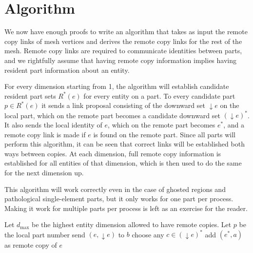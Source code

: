 \documentclass{article}
\begin{document}
\section{Algorithm}

We now have enough proofs to write an algorithm that takes
as input the remote copy links of mesh vertices and
derives the remote copy links for the rest of the mesh.
Remote copy links are required to communicate identities
between parts, and we rightfully assume that having
remote copy information implies having resident part information
about an entity.

For every dimension starting from 1, the algorithm will establish
candidate resident part sets $R^*(e)$ for every entity on a part.
To every candidate part $p \in R^*(e)$ it sends a link proposal
consisting of the downward set $\downarrow e$ on the local part,
which on the remote part becomes a candidate downward set
$(\downarrow e)^*$.
It also sends the local identity of $e$, which
on the remote part becomes $e^*$, and a
remote copy link is made if $e$ is found on
the remote part.
Since all parts will perform this algorithm, it can be seen
that correct links will be established both ways between
copies.
At each dimension, full remote copy information is established
for all entities of that dimension, which is then used to
do the same for the next dimension up.

This algorithm will work correctly even in the case of ghosted
regions and pathological single-element parts,
but it only works for one part per process.
Making it work for multiple parts per process is left as
an exercise for the reader.

\pagebreak

\begin{algorithmic}
\State Let $d_\text{max}$ be the highest entity dimension allowed
to have remote copies.
\State Let $p$ be the local part number
\State send $(e,\downarrow e)$ to $b$
\EndFor
\EndFor
{}
\State choose any $c \in (\downarrow e)^*$
\State add $(e^*,a)$ as remote copy of $e$
\EndIf
\EndFor
\EndFor
\EndFor
\EndFunction
\end{algorithmic}
\end{document}
